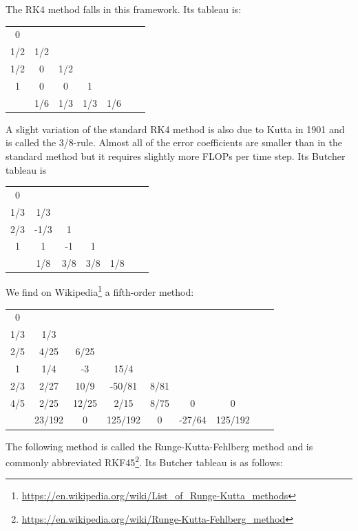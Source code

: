 The RK4 method falls in this framework. Its tableau is:

\begin{mdframed}[backgroundcolor=blue!5]
\begin{tabular}{c|cccccc}
0 & \\
1/2 & 1/2 \\
1/2 & 0 & 1/2 \\
1 & 0 & 0 & 1 \\
\hline
 & 1/6 & 1/3 & 1/3 & 1/6 
\end{tabular}
\end{mdframed}

A slight variation of the standard RK4 method is also due to Kutta in 1901 and is called the 3/8-rule. 
Almost all of the error coefficients are smaller than in the standard method but it requires 
slightly more FLOPs per time step. Its Butcher tableau is

\begin{mdframed}[backgroundcolor=blue!5]
\begin{tabular}{c|cccccc}
0 & \\
1/3 & 1/3 \\
2/3 & -1/3 & 1 \\
1 & 1 & -1 & 1 \\
\hline
 & 1/8 & 3/8 & 3/8 & 1/8 
\end{tabular}
\end{mdframed}

We find on Wikipedia\footnote{\url{https://en.wikipedia.org/wiki/List_of_Runge-Kutta_methods}}
a fifth-order method:

\begin{mdframed}[backgroundcolor=blue!5]
\begin{tabular}{c|cccccccc}
0 & \\
1/3 & 1/3 \\
2/5 & 4/25 & 6/25 \\
1 & 1/4 & -3 & 15/4 \\
2/3 & 2/27 & 10/9 & -50/81 & 8/81 \\
4/5 & 2/25 & 12/25 & 2/15 & 8/75 & 0 & 0 \\ 
\hline
 & 23/192 & 0 & 125/192 & 0 & -27/64 & 125/192 \\
\end{tabular}
\end{mdframed}


 
The following method is called the Runge-Kutta-Fehlberg method and is 
commonly abbreviated 
RKF45\footnote{\url{https://en.wikipedia.org/wiki/Runge-Kutta-Fehlberg_method}}. 
Its Butcher tableau is as follows: 

